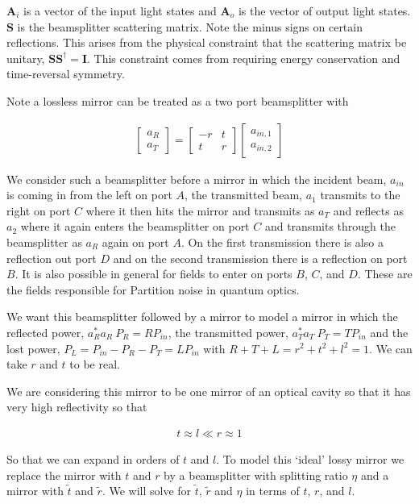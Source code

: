 \documentclass[12pt]{article}
\newcommand{\bv}[1]{\boldsymbol{#1}}
\begin{document}
$\bv{A}_i$ is a vector of the input light states and $\bv{A}_o$ is the vector of output light states. $\bv{S}$ is the beamsplitter scattering matrix. Note the minus signs on certain reflections. This arises from the physical constraint that the scattering matrix be unitary, $\bv{S} \bv{S}^{\dag} = \bv{I}$. This constraint comes from requiring energy conservation and time-reversal symmetry.

Note a lossless mirror can be treated as a two port beamsplitter with

\begin{align}
\begin{bmatrix}
a_R\\ a_T
\end{bmatrix}
=
\begin{bmatrix}
-r & t\\
t & r
\end{bmatrix}
\begin{bmatrix}
a_{in,1} \\ a_{in,2}
\end{bmatrix}
\end{align}

We consider such a beamsplitter before a mirror in which the incident beam, $a_{in}$ is coming in from the left on port $A$, the transmitted beam, $a_1$ transmits to the right on port $C$ where it then hits the mirror and transmits as $a_T$ and reflects as $a_2$ where it again enters the beamsplitter on port $C$ and transmits through the beamsplitter as $a_R$ again on port $A$.
On the first transmission there is also a reflection out port $D$ and on the second transmission there is a reflection on port $B$. It is also possible in general for fields to enter on ports $B$, $C$, and $D$. These are the fields responsible for Partition noise in quantum optics.

We want this beamsplitter followed by a mirror to model a mirror in which the reflected power, $a^*_R a_R ~ P_R = R P_{in}$, the transmitted power, $a^*_T a_T ~ P_T = T P_{in}$ and the lost power, $P_L = P_{in} - P_R - P_T = LP_{in}$ with $R+T+L = r^2 + t^2 + l^2 =  1$.  We can take $r$ and $t$ to be real.

We are considering this mirror to be one mirror of an optical cavity so that it has very high reflectivity so that

\begin{align}
t \approx l \ll r \approx 1
\end{align}

So that we can expand in orders of $t$ and $l$.
To model this `ideal' lossy mirror we replace the mirror with $t$ and $r$ by a beamsplitter with splitting ratio $\eta$ and a mirror with $\tilde{t}$ and $\tilde{r}$. We will solve for $\tilde{t}$, $\tilde{r}$ and $\eta$ in terms of $t$, $r$, and $l$.
\end{document}
